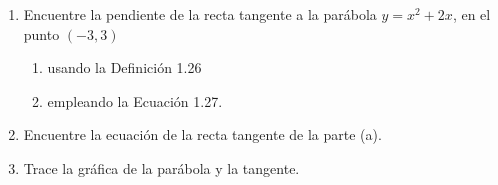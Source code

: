 \item 
    \begin{enumerate}
        \item Encuentre la pendiente de la recta tangente a la parábola $y = x^2 + 2x$, en el punto $(-3, 3)$
        \begin{enumerate}
            \item[(i)] usando la Definición 1.26
            \item[(ii)] empleando la Ecuación 1.27.
        \end{enumerate}
        \item Encuentre la ecuación de la recta tangente de la parte (a).
        \item Trace la gráfica de la parábola y la tangente.
    \end{enumerate}
    
    \vspace{0.5cm}
    \begin{center}
    \end{center}
